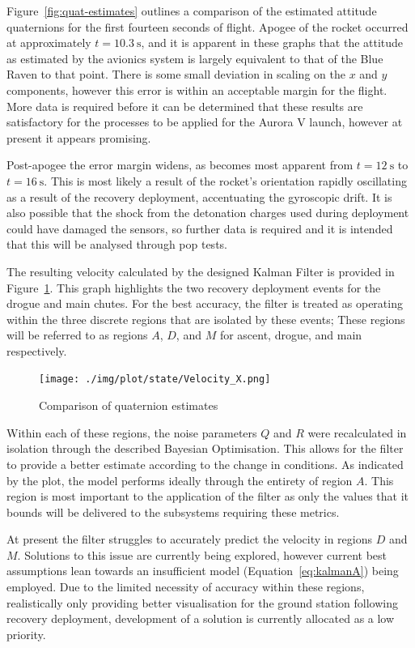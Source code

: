 Figure~\ref{fig:quat-estimates} outlines a comparison of the estimated attitude quaternions for the first fourteen seconds of flight. Apogee of the rocket occurred at approximately $t=\SI{10.3}{\second}$, and it is apparent in these graphs that the attitude as estimated by the avionics system is largely equivalent to that of the Blue Raven to that point. There is some small deviation in scaling on the $x$ and $y$ components, however this error is within an acceptable margin for the flight. More data is required before it can be determined that these results are satisfactory for the processes to be applied for the Aurora V launch, however at present it appears promising.

Post-apogee the error margin widens, as becomes most apparent from $t=\SI{12}{\second}$ to $t=\SI{16}{\second}$. This is most likely a result of the rocket's orientation rapidly oscillating as a result of the recovery deployment, accentuating the gyroscopic drift. It is also possible that the shock from the detonation charges used during deployment could have damaged the sensors, so further data is required and it is intended that this will be analysed through pop tests.

The resulting velocity calculated by the designed Kalman Filter is provided in Figure~\ref{fig:kalman}. This graph highlights the two recovery deployment events for the drogue and main chutes. For the best accuracy, the filter is treated as operating within the three discrete regions that are isolated by these events; These regions will be referred to as regions $A$, $D$, and $M$ for ascent, drogue, and main respectively.

\begin{figure}[ht!]
  \centering
  \texttt{[image: ./img/plot/state/Velocity\_X.png]}
  \caption{Comparison of quaternion estimates}\label{fig:kalman}
\end{figure}

Within each of these regions, the noise parameters $Q$ and $R$ were recalculated in isolation through the described Bayesian Optimisation. This allows for the filter to provide a better estimate according to the change in conditions. As indicated by the plot, the model performs ideally through the entirety of region $A$. This region is most important to the application of the filter as only the values that it bounds will be delivered to the subsystems requiring these metrics. 

At present the filter struggles to accurately predict the velocity in regions $D$ and $M$. Solutions to this issue are currently being explored, however current best assumptions lean towards an insufficient model (Equation~\ref{eq:kalmanA}) being employed. Due to the limited necessity of accuracy within these regions, realistically only providing better visualisation for the ground station following recovery deployment, development of a solution is currently allocated as a low priority.

